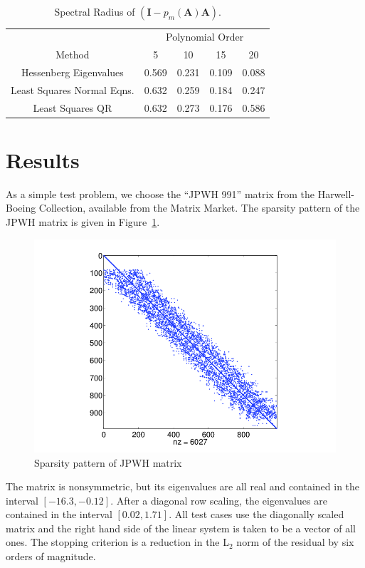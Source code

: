 \documentclass[10pt]{article}
\newcommand{\bA}{\ensuremath{\mathbf{A}}}
\newcommand{\bI}{\ensuremath{\mathbf{I}}}
\begin{document}
\begin{table}
\centering
\caption{Spectral Radius of $\left( \bI - p_m(\bA) \bA \right)$.}
\label{tab:gmres_poly}
\begin{tabular}{ccccc}
\toprule
& \multicolumn{4}{c}{Polynomial Order} \\
\cmidrule(r){2-5}
Method & 5 & 10 & 15 & 20 \\
\midrule
Hessenberg Eigenvalues     & 0.569 & 0.231 & 0.109 & 0.088 \\
Least Squares Normal Eqns. & 0.632 & 0.259 & 0.184 & 0.247 \\
Least Squares QR           & 0.632 & 0.273 & 0.176 & 0.586 \\
\bottomrule
\end{tabular}
\end{table}

\section{Results}
\label{sec:results}

As a simple test problem, we choose the ``JPWH 991'' matrix from
the Harwell-Boeing Collection, available from the Matrix Market.
The sparsity pattern of the JPWH matrix is given in Figure~\ref{fig:jpwh_sparsity}.
\begin{figure}
\centering
\includegraphics[width=4.5in]{jpwh_sparsity}
\caption{Sparsity pattern of JPWH matrix \label{fig:jpwh_sparsity}}
\end{figure}
The matrix is nonsymmetric, but its eigenvalues are all real and
contained in the interval $[-16.3,-0.12]$.  After a diagonal row
scaling, the eigenvalues are contained in the interval $[0.02,1.71]$.
All test cases use the diagonally scaled matrix and the right
hand side of the linear system is taken to be a vector of all ones.
The stopping criterion is a reduction in the L$_2$ norm of the residual
by six orders of magnitude.
\end{document}
